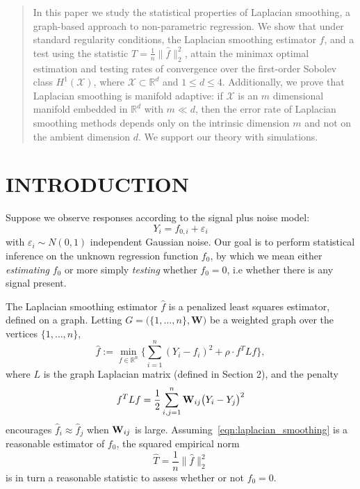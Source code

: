 \documentclass[twoside]{article}
\newcommand{\Reals}{\mathbb{R}}
\newcommand{\1}{\mathbf{1}}
\newcommand{\Rd}{\Reals^d}
\newcommand{\Lap}{L}
\newcommand{\Xset}{\mathcal{X}}
\newcommand{\wh}[1]{\widehat{#1}}
\theoremstyle{definition}
\theoremstyle{remark}
\begin{document}
	
	

\begin{abstract}
	In this paper we study the statistical properties of Laplacian smoothing, a graph-based approach to non-parametric regression. We show that under standard regularity conditions, the Laplacian smoothing estimator $\wh{f}$, and a test using the statistic $T = \frac{1}{n}\|\wh{f}\|_2^2$, attain the minimax optimal estimation and testing rates of convergence over the first-order Sobolev class $H^1(\Xset)$, where $\Xset \subset \Rd$ and $1 \leq d \leq 4$. Additionally, we prove that Laplacian smoothing is manifold adaptive: if $\Xset$ is an $m$ dimensional manifold embedded in $\Reals^d$ with $m \ll d$, then the error rate of Laplacian smoothing methods depends only on the intrinsic dimension $m$ and not on the ambient dimension $d$. We support our theory with simulations.
\end{abstract}

\section{INTRODUCTION}

Suppose we observe responses according to the signal plus noise model:
\begin{equation}
\label{eqn:signal_plus_noise_model}
Y_i = f_{0,i} + \varepsilon_i
\end{equation}
with $\varepsilon_i \sim N(0,1)$ independent Gaussian noise. Our goal is to perform statistical inference on the unknown regression function $f_0$, by which we mean either \emph{estimating} $f_0$ or more simply \emph{testing} whether $f_0 = 0$, i.e whether there is any signal present. 

The Laplacian smoothing estimator $\wh{f}$ \citep{smola2003} is a penalized least squares estimator, defined on a graph. Letting $G = \bigl(\{1,\ldots,n\},\mathbf{W}\bigr)$ be a weighted graph over the vertices $\{1,\ldots,n\}$, 
\begin{equation}
\label{eqn:laplacian_smoothing}
\wh{f} :=  \min_{f \in \Reals^n} \biggl\{\sum_{i = 1}^{n}(Y_i - f_i)^2 + \rho \cdot f^T \Lap f \biggr\},
\end{equation}
where $\Lap$ is the graph Laplacian matrix (defined in Section 2), and the penalty
\begin{equation*}
f^T \Lap f = \frac{1}{2} \sum_{i,j = 1}^{n} {\bf W}_{ij}\bigl(Y_i - Y_j\bigr)^2
\end{equation*}
encourages $\wh{f}_i \approx \wh{f}_j$ when ${\bf W}_{ij}$ is large. Assuming~\eqref{eqn:laplacian_smoothing} is a reasonable estimator of $f_0$, the squared empirical norm
\begin{equation}
\label{eqn:laplacian_smoothing_test}
\wh{T} = \frac{1}{n}\bigl\|\wh{f}\bigr\|_2^2 
\end{equation}
is in turn a reasonable statistic to assess whether or not $f_0 = 0$. 
\end{document}
